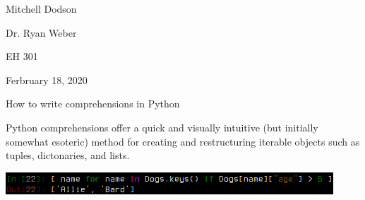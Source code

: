 \documentclass[11pt]{article}
\begin{document}
\begin{singlespace}
Mitchell Dodson

Dr. Ryan Weber %

EH 301 %

Ferbruary 18, 2020 %
\end{singlespace}

\begin{center}
{\Large\sc
How to write comprehensions in Python
}
\end{center}


\begin{center}
Python comprehensions offer a quick and visually intuitive (but initially somewhat esoteric) method for creating and restructuring iterable objects such as tuples, dictonaries, and lists.
\end{center}


\begin{center}
	\includegraphics[width=.66\linewidth]{./figures/comp.png}
	\label{comp} %
\end{center}
\end{document}
